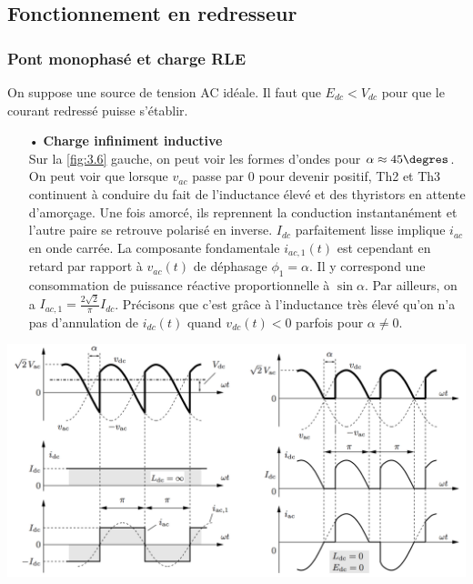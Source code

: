 			\subsection{Fonctionnement en redresseur}
				\subsubsection{Pont monophasé et charge RLE}
					On suppose une source de tension AC idéale. Il faut que $E_{dc} < V_{dc}$ pour que le courant redressé puisse s'établir. \\
					
					\begin{itemize}
					\item[•] \textbf{Charge infiniment inductive}\\
					Sur la \autoref{fig:3.6} gauche, on peut voir les formes d'ondes pour $\alpha \approx 45\degres$. On peut voir que lorsque $v_{ac}$ passe par 0 pour devenir positif, Th2 et Th3 continuent à conduire du fait de l'inductance élevé et des thyristors en attente d'amorçage. Une fois amorcé, ils reprennent la conduction instantanément et l'autre paire se retrouve polarisé en inverse. $I_{dc}$ parfaitement lisse implique $i_{ac}$ en onde carrée. La composante fondamentale $i_{ac,1}(t)$ est cependant en retard par rapport à $v_{ac}(t)$ de déphasage $\phi _1 = \alpha$. Il y correspond une consommation de puissance réactive proportionnelle à $\sin \alpha$. Par ailleurs, on a $I_{ac,1} = \frac{2\sqrt{2}}{\pi}I_{dc}$. Précisons que c'est grâce à l'inductance très élevé qu'on n'a pas d'annulation de $i_{dc}(t)$ quand $v_{dc}(t)<0$ parfois pour $\alpha \neq 0$. 
					\end{itemize}
					
					\begin{center}
					\includegraphics[scale=0.3]{ch3/6}
					\label{fig:3.6}
					\end{center}
					
